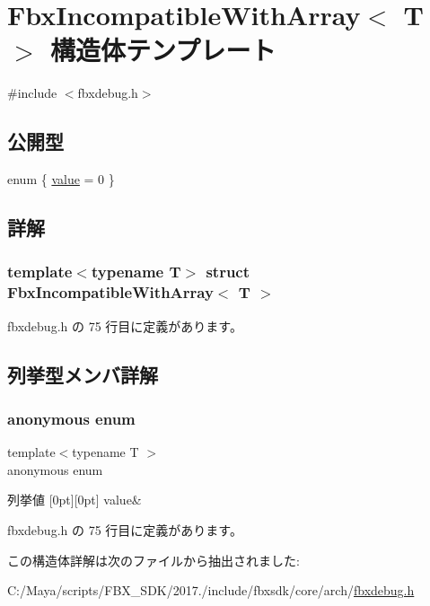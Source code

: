 \hypertarget{struct_fbx_incompatible_with_array}{}\section{Fbx\+Incompatible\+With\+Array$<$ T $>$ 構造体テンプレート}
\label{struct_fbx_incompatible_with_array}


{\ttfamily \#include $<$fbxdebug.\+h$>$}

\subsection*{公開型}
\begin{DoxyCompactItemize}
\item 
enum \{ \hyperlink{struct_fbx_incompatible_with_array_a743e133c2fd464a89727c246358c5a58a9cca835a5c42f16108589087ba958114}{value} = 0
 \}
\end{DoxyCompactItemize}


\subsection{詳解}
\subsubsection*{template$<$typename T$>$\newline
struct Fbx\+Incompatible\+With\+Array$<$ T $>$}



 fbxdebug.\+h の 75 行目に定義があります。



\subsection{列挙型メンバ詳解}
\mbox{\label{struct_fbx_incompatible_with_array_a743e133c2fd464a89727c246358c5a58}} 
\subsubsection{\texorpdfstring{anonymous enum}{anonymous enum}}
{\footnotesize\ttfamily template$<$typename T $>$ \\
anonymous enum}

\begin{DoxyEnumFields}{列挙値}
[0pt][0pt]{}\mbox{\label{struct_fbx_incompatible_with_array_a743e133c2fd464a89727c246358c5a58a9cca835a5c42f16108589087ba958114}} 
value&\\
\hline

\end{DoxyEnumFields}


 fbxdebug.\+h の 75 行目に定義があります。



この構造体詳解は次のファイルから抽出されました\+:\begin{DoxyCompactItemize}
\item 
C\+:/\+Maya/scripts/\+F\+B\+X\+\_\+\+S\+D\+K/2017./include/fbxsdk/core/arch/\hyperlink{fbxdebug_8h}{fbxdebug.\+h}\end{DoxyCompactItemize}
